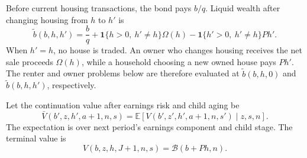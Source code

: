 \documentclass[11pt]{article}
\theoremstyle{definition}
\newcommand{\E}{\mathbb E}
\newcommand{\1}{\mathbf 1}
\newcommand{\Bcal}{\mathcal B}
\begin{document}
Before current housing transactions, the bond pays $b/q$. Liquid wealth after
changing housing from $h$ to $h'$ is
\begin{equation}
\tilde b(b,h,h')
=
\frac{b}{q}
+\1\{h>0,\ h'\neq h\}\Omega(h)
-\1\{h'>0,\ h'\neq h\}Ph'.
\label{eq:quant_adjusted_wealth}
\end{equation}
When $h'=h$, no house is traded. An owner who changes housing receives the net
sale proceeds $\Omega(h)$, while a household choosing a new owned house pays
$Ph'$. The renter and owner problems below are therefore evaluated at
$\tilde b(b,h,0)$ and $\tilde b(b,h,h')$, respectively.

Let the continuation value after earnings risk and child aging be
\begin{equation}
\bar V(b',z,h',a+1,n,s)
=
\E\left[
V(b',z',h',a+1,n,s')
\mid z,s,n
\right].
\label{eq:quant_continuation}
\end{equation}
The expectation is over next period's earnings component and child stage.
The terminal value is
\[
V(b,z,h,J+1,n,s)=\Bcal(b+Ph,n).
\]
\end{document}
